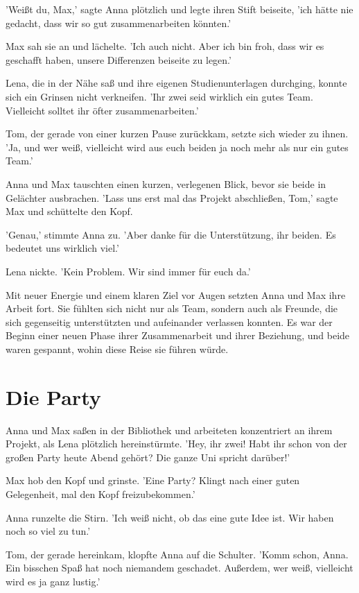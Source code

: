 \documentclass[12pt]{article}
\begin{document}
'Weißt du, Max,' sagte Anna plötzlich und legte ihren Stift beiseite, 'ich hätte nie gedacht, dass wir so gut zusammenarbeiten könnten.'

Max sah sie an und lächelte. 'Ich auch nicht. Aber ich bin froh, dass wir es geschafft haben, unsere Differenzen beiseite zu legen.'

Lena, die in der Nähe saß und ihre eigenen Studienunterlagen durchging, konnte sich ein Grinsen nicht verkneifen. 'Ihr zwei seid wirklich ein gutes Team. Vielleicht solltet ihr öfter zusammenarbeiten.'

Tom, der gerade von einer kurzen Pause zurückkam, setzte sich wieder zu ihnen. 'Ja, und wer weiß, vielleicht wird aus euch beiden ja noch mehr als nur ein gutes Team.'

Anna und Max tauschten einen kurzen, verlegenen Blick, bevor sie beide in Gelächter ausbrachen. 'Lass uns erst mal das Projekt abschließen, Tom,' sagte Max und schüttelte den Kopf.

'Genau,' stimmte Anna zu. 'Aber danke für die Unterstützung, ihr beiden. Es bedeutet uns wirklich viel.'

Lena nickte. 'Kein Problem. Wir sind immer für euch da.'

Mit neuer Energie und einem klaren Ziel vor Augen setzten Anna und Max ihre Arbeit fort. Sie fühlten sich nicht nur als Team, sondern auch als Freunde, die sich gegenseitig unterstützten und aufeinander verlassen konnten. Es war der Beginn einer neuen Phase ihrer Zusammenarbeit und ihrer Beziehung, und beide waren gespannt, wohin diese Reise sie führen würde.

\section{ Die Party }
 Anna und Max saßen in der Bibliothek und arbeiteten konzentriert an ihrem Projekt, als Lena plötzlich hereinstürmte. 'Hey, ihr zwei! Habt ihr schon von der großen Party heute Abend gehört? Die ganze Uni spricht darüber!'

Max hob den Kopf und grinste. 'Eine Party? Klingt nach einer guten Gelegenheit, mal den Kopf freizubekommen.'

Anna runzelte die Stirn. 'Ich weiß nicht, ob das eine gute Idee ist. Wir haben noch so viel zu tun.'

Tom, der gerade hereinkam, klopfte Anna auf die Schulter. 'Komm schon, Anna. Ein bisschen Spaß hat noch niemandem geschadet. Außerdem, wer weiß, vielleicht wird es ja ganz lustig.'
\end{document}
